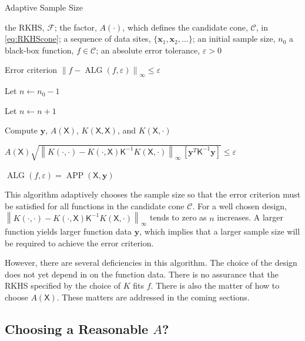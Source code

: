 \documentclass[]{mcom-l}
\theoremstyle{remark}
\DeclareMathOperator{\ALG}{ALG}
\DeclareMathOperator{\APP}{APP}
\newcommand{\mK}{\mathsf{K}}
\newcommand{\mX}{\mathsf{X}}
\newcommand{\bx}{{\boldsymbol{x}}}
\newcommand{\by}{{\boldsymbol{y}}}
\newcommand{\cc}{\mathcal{C}}
\newcommand{\calf}{{\mathcal{F}}}
\newcommand{\norm}[2][{}]{\ensuremath{\left \lVert #2 \right \rVert}_{#1}}
\begin{document}
\begin{algorithm}[H]
\caption{Adaptive Sample Size \label{alg:basicadapt}}
	\begin{algorithmic}
	\PARAM the RKHS, $\calf$; the factor, $A(\cdot)$, which defines  the candidate cone, $\cc$, in \eqref{eq:RKHScone};  a sequence of data sites, $\{\bx_1, \bx_2, \ldots \}$; an initial sample size, $n_0$
	\INPUT a black-box function, $f \in \cc$; an absolute error tolerance, $\varepsilon>0$

    \Ensure Error criterion $\norm[\infty]{f - \ALG(f,\varepsilon)} \le \varepsilon$

   \State Let $n \leftarrow n_0 -1$

\Repeat

\State Let $n \leftarrow n + 1$

\State Compute $\by$, $A(\mX)$, $K(\mX,\mX)$, and $K(\mX,\cdot)$

\Until $A(\mX) \sqrt{\norm[\infty]{K(\cdot,\cdot) - K(\cdot,\mX) \mK^{-1} K(\mX,\cdot)} \, [\by^T \mK^{-1} \by] }  \le \varepsilon$

\RETURN $\ALG(f,\varepsilon) = \APP(\mX,\by)$

\end{algorithmic}
\end{algorithm}

This algorithm adaptively chooses the sample size so that the error criterion must be satisfied for all functions in the candidate cone $\cc$.  For a well chosen design, $\norm[\infty]{K(\cdot,\cdot) - K(\cdot,\mX) \mK^{-1} K(\mX,\cdot)}$ tends to zero as $n$ increases.  A larger function yields larger function data $\by$, which implies that a larger sample size will be required to achieve the error criterion.

However, there are several deficiencies in this algorithm.  The choice of the design does not yet depend in on the function data.  There is no assurance that the RKHS specified by the choice of $K$ fits $f$.  There is also the matter of how to choose $A(\mX)$.  These matters are addressed in the coming sections.


\subsection{Choosing a Reasonable $A$?}
\end{document}
